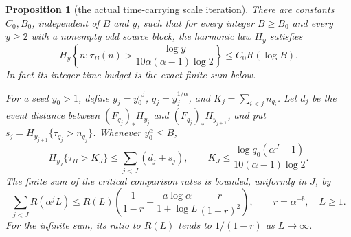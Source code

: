 \documentclass[11pt]{article}
\newtheorem{proposition}{Proposition}
\theoremstyle{remark}\newtheorem{remark}[proposition]{Remark}
\begin{document}
\begin{proposition}[the actual time-carrying scale iteration]
\label{prop:mazur-critical-iteration}
There are constants \(C_0,B_0\), independent of \(B\) and \(y\),
such that for every integer \(B\ge B_0\) and every \(y\ge2\)
with a nonempty odd source block, the harmonic law \(H_y\) satisfies
\begin{equation}
 H_y\left\{n:\tau_B(n)>
 \frac{\log y}{10\alpha(\alpha-1)\log2}\right\}
 \le C_0 R(\log B).
 \label{eq:mazur-harmonic-timed}
\end{equation}
In fact its integer time budget is the exact finite sum below.

For a seed \(y_0>1\), define
\(y_j=y_0^{\alpha^j}\), \(q_j=y_j^{1/\alpha}\), and
\(K_j=\sum_{i<j}n_{q_i}\). Let \(d_j\) be the event distance
between \((F_{q_j})_*H_{y_j}\) and
\((F_{q_j})_*H_{y_{j+1}}\), and put
\(s_j=H_{y_{j+1}}\{\tau_{q_j}>n_{q_j}\}\).
Whenever \(y_0^\alpha\le B\),
\begin{equation}
 H_{y_J}\{\tau_B>K_J\}\le\sum_{j<J}(d_j+s_j),\qquad
 K_J\le\frac{\log q_0(\alpha^J-1)}
                   {10(\alpha-1)\log2}.
 \label{eq:mazur-timed-telescope}
\end{equation}
The finite sum of the critical comparison rates is bounded, uniformly
in \(J\), by
\begin{equation}
 \sum_{j<J}R(\alpha^j L)
 \le R(L)\left(\frac1{1-r}
       +\frac{a\log\alpha}{1+\log L}\frac r{(1-r)^2}\right),
 \qquad r=\alpha^{-b},\quad L\ge1.
 \label{eq:mazur-critical-geometric}
\end{equation}
For the infinite sum, its ratio to \(R(L)\) tends to \(1/(1-r)\)
as \(L\to\infty\).
\end{proposition}
\end{document}

